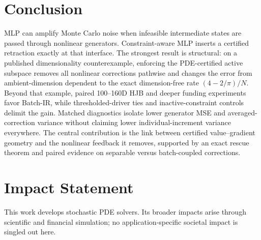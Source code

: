 \documentclass{article}
\begin{document}
\section{Conclusion}
MLP can amplify Monte Carlo noise when infeasible intermediate states are passed through nonlinear generators. Constraint-aware MLP inserts a certified retraction exactly at that interface. The strongest result is structural: on a published dimensionality counterexample, enforcing the PDE-certified active subspace removes all nonlinear corrections pathwise and changes the error from ambient-dimension dependent to the exact dimension-free rate $(4-2/\pi)/N$. Beyond that example, paired 100--160D HJB and deeper funding experiments favor Batch-IR, while thresholded-driver ties and inactive-constraint controls delimit the gain. Matched diagnostics isolate lower generator MSE and averaged-correction variance without claiming lower individual-increment variance everywhere. The central contribution is the link between certified value--gradient geometry and the nonlinear feedback it removes, supported by an exact rescue theorem and paired evidence on separable versus batch-coupled corrections.

\label{sec:main-end}
\FloatBarrier

\section*{Impact Statement}
This work develops stochastic PDE solvers. Its broader impacts arise through scientific and financial simulation; no application-specific societal impact is singled out here.
\end{document}
